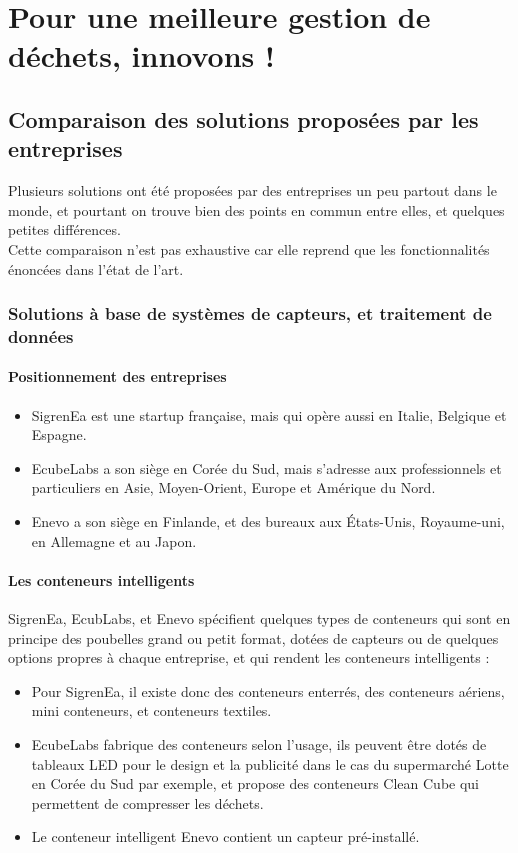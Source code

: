 \documentclass[a4paper,12pt]{report}
\begin{document}
\chapter{Pour une meilleure gestion de déchets, innovons !}
\section{Comparaison des solutions proposées par les entreprises}
Plusieurs solutions ont été proposées par des entreprises un peu partout dans le monde, et pourtant on trouve bien des points en commun entre elles, et quelques petites différences.\\
Cette comparaison n'est pas exhaustive car elle reprend que les fonctionnalités énoncées dans l'état de l'art.

\subsection*{Solutions à base de systèmes de capteurs, et traitement de données}
\subsubsection*{Positionnement des entreprises}
\begin{itemize}
\item SigrenEa est une startup française, mais qui opère aussi en Italie, Belgique et Espagne.
\item EcubeLabs a son siège en Corée du Sud, mais s'adresse aux professionnels et particuliers en Asie, Moyen-Orient, Europe et Amérique du Nord.
\item Enevo a son siège en Finlande, et des bureaux aux États-Unis, Royaume-uni, en Allemagne et au Japon.
\end{itemize}
\subsubsection*{Les conteneurs intelligents}
SigrenEa, EcubLabs, et Enevo spécifient quelques types de conteneurs qui sont en principe des poubelles grand ou petit format, dotées de capteurs ou de quelques options propres à chaque entreprise, et qui rendent les conteneurs intelligents :
\begin{itemize}
\item Pour SigrenEa, il existe donc des conteneurs enterrés, des conteneurs aériens, mini conteneurs, et conteneurs textiles.
\item EcubeLabs fabrique des conteneurs selon l'usage, ils peuvent être dotés de tableaux LED pour le design et la publicité dans le cas du supermarché Lotte en Corée du Sud par exemple, et propose des conteneurs Clean Cube qui permettent de compresser les déchets.
\item Le conteneur intelligent Enevo contient un capteur pré-installé.
\end{itemize}
\end{document}
